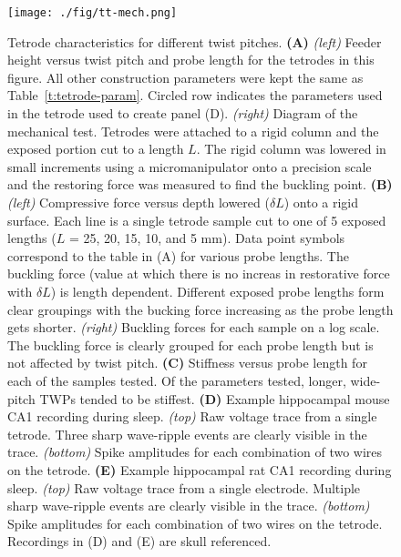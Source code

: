 \documentclass[11pt,a4paper]{article}
\begin{document}
\begin{figure}
\centering
\texttt{[image: ./fig/tt-mech.png]}
\caption{Tetrode characteristics for different twist pitches.
    \textbf{(A)} \textit{(left)} Feeder height versus twist pitch and probe
    length for the tetrodes in this figure. All other construction parameters
    were kept the same as Table~\ref{t:tetrode-param}. Circled row indicates
    the parameters used in the tetrode used to create panel (D).
    \textit{(right)} Diagram of the mechanical test. Tetrodes were attached to a rigid column
    and the exposed portion cut to a length $L$. The rigid column was lowered
    in small increments using a micromanipulator onto a precision scale and the
    restoring force was measured to find the buckling point.
    \textbf{(B)} \textit{(left)} Compressive force versus depth lowered
    ($\delta L$) onto a rigid surface.  Each line is a single tetrode sample
    cut to one of 5 exposed lengths ($L$ = 25, 20, 15, 10, and 5 mm). Data
    point symbols correspond to the table in (A) for various probe lengths.
    The buckling force (value at which there is no increas in restorative force
    with $\delta L$) is length dependent. Different exposed probe lengths form
    clear groupings with the bucking force increasing as the probe length gets
    shorter. \textit{(right)} Buckling forces for each sample on a log scale.
    The buckling force is clearly grouped for each probe length but is not
    affected by twist pitch.
    \textbf{(C)} Stiffness versus probe length for each of the samples tested.
    Of the parameters tested, longer, wide-pitch TWPs tended to be stiffest.
    \textbf{(D)} Example hippocampal mouse CA1 recording during sleep.
    \textit{(top)} Raw voltage trace from a single tetrode. Three sharp
    wave-ripple events are clearly visible in the trace. \textit{(bottom)}
    Spike amplitudes for each combination of two wires on the tetrode.
    \textbf{(E)} Example hippocampal rat CA1 recording during sleep.
    \textit{(top)} Raw voltage trace from a single electrode. Multiple sharp
    wave-ripple events are clearly visible in the trace. \textit{(bottom)}
    Spike amplitudes for each combination of two wires on the tetrode.
    Recordings in (D) and (E) are skull referenced.
}

\label{f:trode-char}
\end{figure}
\end{document}
